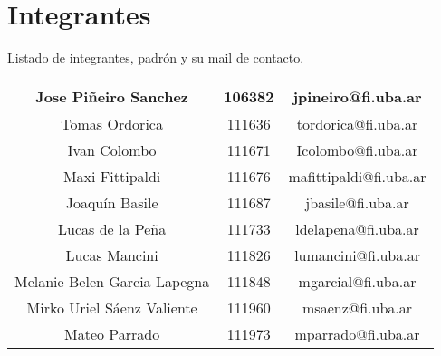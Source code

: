 \section{Integrantes}

Listado de integrantes, padrón y su mail de contacto.
\begin{center}
\begin{tabular}{|c|c|c|}

   \hline\hline
   Jose Piñeiro Sanchez  & 106382 & jpineiro@fi.uba.ar\\
   \hline
   Tomas Ordorica  & 111636 & tordorica@fi.uba.ar\\
   \hline
   Ivan Colombo  & 111671 & Icolombo@fi.uba.ar\\
   \hline
   Maxi Fittipaldi  & 111676 & mafittipaldi@fi.uba.ar\\
   \hline
   Joaquín Basile  & 111687 & jbasile@fi.uba.ar\\
   \hline
   Lucas de la Peña  & 111733 & ldelapena@fi.uba.ar\\
   \hline
   Lucas Mancini  & 111826 & lumancini@fi.uba.ar\\
   \hline
   Melanie Belen Garcia Lapegna  & 111848 & mgarcial@fi.uba.ar\\
   \hline
   Mirko Uriel Sáenz Valiente  & 111960 & msaenz@fi.uba.ar\\
   \hline
   Mateo Parrado  & 111973 & mparrado@fi.uba.ar\\
   \hline\hline
\end{tabular}
\end{center}
